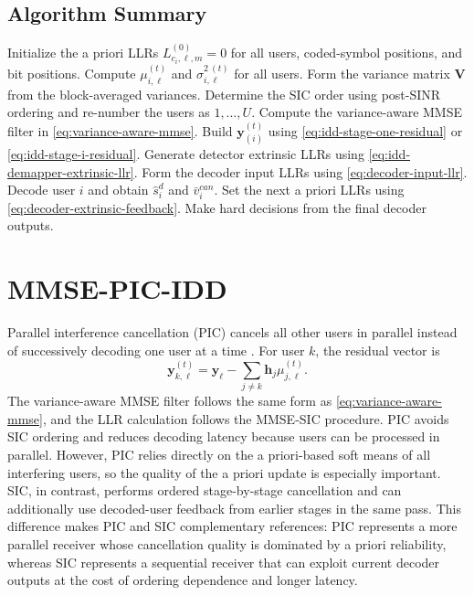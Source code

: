 \subsection{Algorithm Summary}

\begin{algorithm}[t]
\caption{MMSE-SIC-IDD receiver for one coded block}
\label{alg:mmse-sic-idd}
\begin{algorithmic}[1]
\STATE Initialize the a priori LLRs $L^{(0)}_{c_i,\ell,m}=0$ for all users, coded-symbol positions, and bit positions.
    \STATE Compute $\mu^{(t)}_{i,\ell}$ and $\sigma^{2~(t)}_{i,\ell}$ for all users.
    \STATE Form the variance matrix $\bm{V}$ from the block-averaged variances.
    \STATE Determine the SIC order using post-SINR ordering and re-number the users as $1,\ldots,U$.
        \STATE Compute the variance-aware MMSE filter in \eqref{eq:variance-aware-mmse}.
        \STATE Build $\bm{y}^{(t)}_{(i)}$ using \eqref{eq:idd-stage-one-residual} or \eqref{eq:idd-stage-i-residual}.
        \STATE Generate detector extrinsic LLRs using \eqref{eq:idd-demapper-extrinsic-llr}.
        \STATE Form the decoder input LLRs using \eqref{eq:decoder-input-llr}.
        \STATE Decode user $i$ and obtain $\hat{s}^{d}_{i}$ and $\bar{v}_i^{can}$.
    \ENDFOR
    \STATE Set the next a priori LLRs using \eqref{eq:decoder-extrinsic-feedback}.
\ENDFOR
\STATE Make hard decisions from the final decoder outputs.
\end{algorithmic}
\end{algorithm}

\section{MMSE-PIC-IDD}

Parallel interference cancellation (PIC) cancels all other users in parallel instead of successively decoding one user at a time \cite{studer2011siso}. For user $k$, the residual vector is
\begin{equation}
    \bm{y}^{(t)}_{k,\ell}
    =
    \bm{y}_\ell
    -
    \sum_{j\ne k}\bm{h}_j\mu^{(t)}_{j,\ell}.
    \label{eq:pic-residual}
\end{equation}
The variance-aware MMSE filter follows the same form as \eqref{eq:variance-aware-mmse}, and the LLR calculation follows the MMSE-SIC procedure. PIC avoids SIC ordering and reduces decoding latency because users can be processed in parallel. However, PIC relies directly on the a priori-based soft means of all interfering users, so the quality of the a priori update is especially important. SIC, in contrast, performs ordered stage-by-stage cancellation and can additionally use decoded-user feedback from earlier stages in the same pass. This difference makes PIC and SIC complementary references: PIC represents a more parallel receiver whose cancellation quality is dominated by a priori reliability, whereas SIC represents a sequential receiver that can exploit current decoder outputs at the cost of ordering dependence and longer latency.

